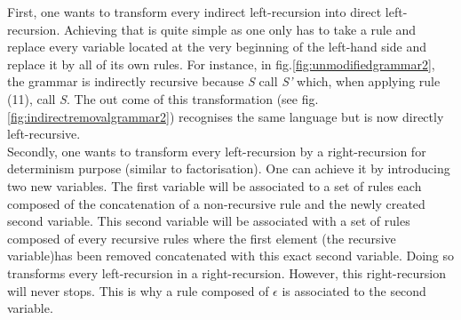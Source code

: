 \documentclass[a4paper,11pt]{article}
\begin{document}
      First, one wants to transform every indirect left-recursion into direct left-recursion. Achieving that is quite simple as one only has to take a rule and replace every variable located at the very beginning of the left-hand side and replace it by all of its own rules. For instance, in fig.\ref{fig:unmodifiedgrammar2}, the grammar is indirectly recursive because \textit{S} call \textit{S'} which, when applying rule (11), call \textit{S}. The out come of this transformation (see fig.\ref{fig:indirectremovalgrammar2}) recognises the same language but is now directly left-recursive.\\
      Secondly, one wants to transform every left-recursion by a right-recursion for determinism purpose (similar to factorisation). One can achieve it by introducing two new variables. The first variable will be associated to a set of rules each composed of the concatenation of a non-recursive rule and the newly created second variable. This second variable will be associated with a set of rules composed of every recursive rules where the first element (the recursive variable)has been removed concatenated with this exact second variable. Doing so transforms every left-recursion in a right-recursion. However, this right-recursion will never stops. This is why a rule composed of $\epsilon$ is associated to the second variable. %
      
\end{document}

